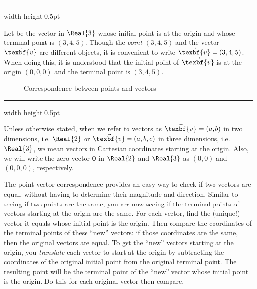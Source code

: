 \vspace{4mm}
\hrule width \textwidth height 0.5pt
\begin{exmp}
 Let  be the vector in $\Real{3}$ whose initial point is at the origin and whose terminal point
 is $(3,4,5)$.  Though the \emph{point} $(3,4,5)$ and the vector $\vec{\texbf{v}}$ are different objects, it is
 convenient to write $\vec{\texbf{v}} = (3,4,5)$.  When doing this, it is understood that the initial point of $\vec{\texbf{v}}$
 is at the origin $(0,0,0)$ and the terminal point is $(3,4,5)$.
\end{exmp}

\begin{figure}[h]
 \centering
 \qquad\qquad
 \caption[]{\quad Correspondence between points and vectors}
 \label{fig:corresp}
\end{figure}
\hrule width \textwidth height 0.5pt
\vspace{4mm}

Unless otherwise stated, when we refer to vectors as $\vec{\texbf{v}} = (a,b)$ in two dimensions, i.e.  $\Real{2}$ or $\vec{\texbf{v}} = (a,b,c)$
in three dimensions, i.e. $\Real{3}$, we mean vectors in Cartesian coordinates starting at the origin.  Also, we will write
the zero vector $\textbf{0}$ in $\Real{2}$ and $\Real{3}$ as $(0,0)$ and $(0,0,0)$, respectively.

The point-vector correspondence provides an easy way to check if two vectors are
equal, without having to determine their magnitude and direction.  Similar to seeing if two points are the same, you are
now seeing if the terminal points of vectors starting at the origin are the same.  For each vector, find the
(unique!) vector it equals whose initial point is the origin.  Then compare the coordinates of the terminal points of
these ``new'' vectors: if those coordinates are the same, then the original vectors are equal.  To get the ``new''
vectors starting at the origin, you \emph{translate}
each vector to start at the origin by subtracting the coordinates of the original
initial point from the original terminal point.  The resulting point will be the terminal point of
the ``new'' vector whose initial point is the origin.  Do this for each original vector then compare.

